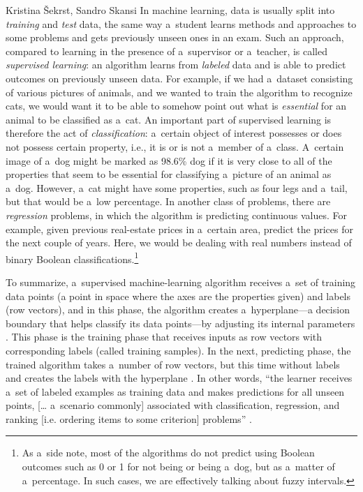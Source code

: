 \begin{artengenv2auth}{Kristina Šekrst, Sandro Skansi}
In machine learning, data is usually split into \textit{training} and \textit{test} data, the same way a~student learns methods and approaches to some problems and gets previously unseen ones in an exam. Such an approach, compared to learning in the presence of a~supervisor or a~teacher, is called \textit{supervised learning}: an algorithm learns from \textit{labeled} data and is able to predict outcomes on previously unseen data. For example, if we had a~dataset consisting of various pictures of animals, and we wanted to train the algorithm to recognize cats, we would want it to be able to somehow point out what is \textit{essential} for an animal to be classified as a~cat. An important part of supervised learning is therefore the act of \textit{classification}: a~certain object of interest possesses or does not possess certain property, i.e., it is or is not a~member of a~class. A~certain image of a~dog might be marked as 98.6\% dog if it is very close to all of the properties that seem to be essential for classifying a~picture of an animal as a~dog. However, a~cat might have some properties, such as four legs and a~tail, but that would be a~low percentage. In another class of problems, there are \textit{regression} problems, in which the algorithm is predicting continuous values. For example, given previous real-estate prices in a~certain area, predict the prices for the next couple of years. Here, we would be dealing with real numbers instead of binary Boolean classifications.\footnote{As a~side note, most of the algorithms do not predict using Boolean outcomes such as 0 or 1 for not being or being a~dog, but as a~matter of a~percentage. In such cases, we are effectively talking about fuzzy intervals.}

To summarize, a~supervised machine-learning algorithm receives a~set of training data points (a point in space where the axes are the properties given) and labels (row vectors), and in this phase, the algorithm creates a~hyperplane—a decision boundary that helps classify its data points—by adjusting its internal parameters
\parencite[][pp.55–56]{skansi_introduction_2018}. %
 This phase is the training phase that receives inputs as row vectors with corresponding labels (called training samples). In the next, predicting phase, the trained algorithm takes a~number of row vectors, but this time without labels and creates the labels with the hyperplane 
\parencite[][p.56]{skansi_introduction_2018}. %
 In other words, ``the learner receives a~set of labeled examples as training data and makes predictions for all unseen points, [… a~scenario commonly] associated with classification, regression, and ranking [i.e. ordering items to some criterion] problems'' 
\parencite[][p.6]{mohri_foundations_2018}.%



\end{artengenv2auth}
